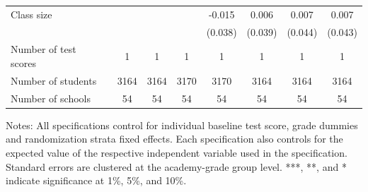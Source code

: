 \begin{center}
\begin{scriptsize}
\begin{threeparttable}
\begin{tabular} {@{} l l c c c c c c c  @{}}
Class size &  &  &  &  & -0.015 & 0.006 & 0.007 & 0.007 \\
                 &  &  &  &  & (0.038) & (0.039) & (0.044) & (0.043) \\
\midrule
Number of test scores &  & 1 & 1 & 1 & 1 & 1 & 1 & 1 \\
Number of students &  & 3164 & 3164 & 3170 & 3170 & 3164 & 3164 & 3164 \\
Number of schools &  & 54 & 54 & 54 & 54 & 54 & 54 & 54 \\
\bottomrule
\end{tabular}
\begin{tablenotes}
\item Notes: All specifications control for individual baseline test score, grade dummies and randomization strata fixed effects. Each specification also controls for the expected value of the respective independent variable used in the specification. Standard errors are clustered at the academy-grade group level. ***, **, and * indicate significance at 1\%, 5\%, and 10\%.\end{tablenotes}
\end{threeparttable}
\end{scriptsize}
\end{center}
\clearpage
